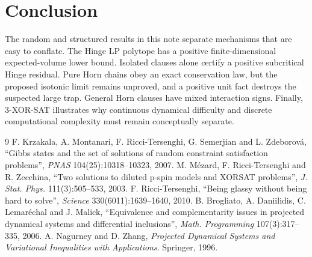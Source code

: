 \documentclass[11pt,a4paper]{article}
\begin{document}
\section{Conclusion}
The random and structured results in this note separate mechanisms that are easy to conflate. The Hinge LP polytope has a positive finite-dimensional expected-volume lower bound. Isolated clauses alone certify a positive subcritical Hinge residual. Pure Horn chains obey an exact conservation law, but the proposed isotonic limit remains unproved, and a positive unit fact destroys the suspected large trap. General Horn clauses have mixed interaction signs. Finally, 3-XOR-SAT illustrates why continuous dynamical difficulty and discrete computational complexity must remain conceptually separate.

\begin{thebibliography}{9}
 F. Krzakala, A. Montanari, F. Ricci-Tersenghi, G. Semerjian and L. Zdeborov\'a, ``Gibbs states and the set of solutions of random constraint satisfaction problems'', \emph{PNAS} 104(25):10318--10323, 2007.
 M. M\'ezard, F. Ricci-Tersenghi and R. Zecchina, ``Two solutions to diluted p-spin models and XORSAT problems'', \emph{J. Stat. Phys.} 111(3):505--533, 2003.
 F. Ricci-Tersenghi, ``Being glassy without being hard to solve'', \emph{Science} 330(6011):1639--1640, 2010.
 B. Brogliato, A. Daniilidis, C. Lemar\'echal and J. Malick, ``Equivalence and complementarity issues in projected dynamical systems and differential inclusions'', \emph{Math. Programming} 107(3):317--335, 2006.
 A. Nagurney and D. Zhang, \emph{Projected Dynamical Systems and Variational Inequalities with Applications}. Springer, 1996.
\end{thebibliography}
\end{document}
